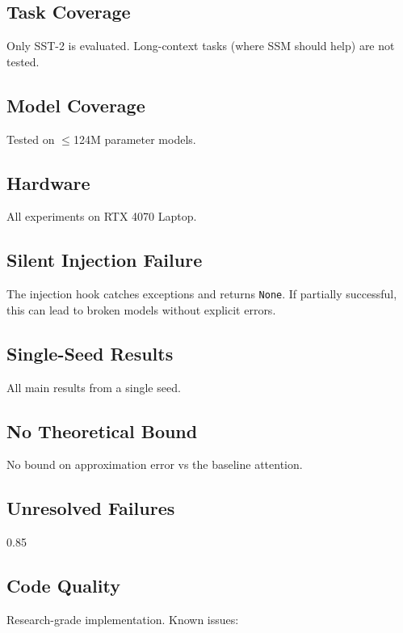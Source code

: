 \subsection{Task Coverage}

Only SST-2 is evaluated. Long-context tasks (where SSM should help) are 
not tested.

\subsection{Model Coverage}

Tested on $\le$124M parameter models.

\subsection{Hardware}

All experiments on RTX 4070 Laptop.

\subsection{Silent Injection Failure}

The injection hook catches exceptions and returns \texttt{None}. If partially 
successful, this can lead to broken models without explicit errors.

\subsection{Single-Seed Results}

All main results from a single seed.

\subsection{No Theoretical Bound}

No bound on approximation error vs the baseline attention.

\subsection{Unresolved Failures}

0.85

\subsection{Code Quality}

Research-grade implementation. Known issues:

